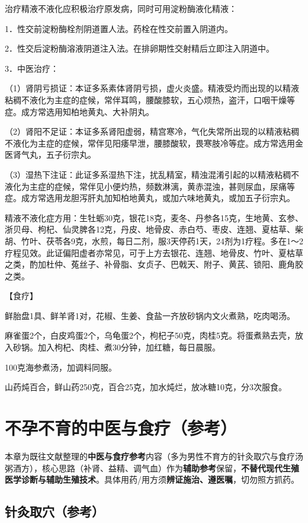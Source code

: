 \documentclass[12pt,UTF8,openany]{ctexbook}
\begin{document}
治疗精液不液化应积极治疗原发病，同时可用淀粉酶液化精液：

1．性交前淀粉酶栓剂阴道置人法。药栓在性交前置入阴道内。

2．性交后淀粉酶溶液阴道注入法。在排卵期性交射精后立即注入阴道中。

3．中医治疗：

（1）肾阴亏损证：本证多系素体肾阴亏损，虚火炎盛。精液受灼而出现的以精液粘稠不液化为主症的症候，常伴耳鸣，腰酸膝软，五心烦热，盗汗，口咽干燥等症。成方常选用知柏地黄丸、大补阴丸。

（2）肾阳不足证：本证多系肾阳虚弱，精宫寒冷，气化失常所出现的以精液粘稠不液化为主症的症候，常伴见阳痿早泄，腰膝酸软，畏寒肢冷等症。成方常选用金医肾气丸，五子衍宗丸。

（3）湿热下注证：此证多系湿热下注，扰乱精室，精浊混淆引起的以精液粘稠不液化为主症的症候，常伴见小便灼热，频数淋漓，黄赤混浊，甚则尿血，尿痛等症。成方常选用龙胆泻肝丸加知柏地黄丸，或加六味地黄丸，或加五子衍宗丸。

精液不液化症方用：生牡蛎30克，银花18克，麦冬、丹参各15克，生地黄、玄参、浙贝母、枸杞、仙灵脾各12克，丹皮、地骨皮、赤白芍、枣皮、连翘、夏枯草、柴胡、竹叶、茯苓各9克，水煎，每日二剂，服3天停药1天，24剂为1疗程。多在1～2疗程见效。此证偏阳虚者亦常见，可于上方去银花、连翘、地骨皮、竹叶、夏枯草之类，酌加杜仲、菟丝子、补骨脂、女贞子、巴戟天、附子、黄芪、锁阳、鹿角胶之类。

【食疗】

鲜胎盘1具、鲜羊肾1对，花椒、生姜、食盐一齐放砂锅内文火煮熟，吃肉喝汤。

麻雀蛋2个，白皮鸡蛋2个，乌龟蛋2个，枸杞子50克，肉桂5克。将蛋煮熟去壳，放入砂锅。加入枸杞、肉桂、煮30分钟，加红糖，每日晨服。

100克海参煮汤，加调料同服。

山药炖百合，鲜山药250克，百合25克，加水炖烂，放冰糖10克，分3次服食。

\chapter{不孕不育的中医与食疗（参考）}

本章为既往文献整理的\textbf{中医与食疗参考}内容（多为男性不育方的针灸取穴与食疗汤粥酒方），核心思路（补肾、益精、调气血）作为\textbf{辅助参考}保留，\textbf{不替代现代生殖医学诊断与辅助生殖技术}。具体用药/用方须\textbf{辨证施治、遵医嘱}，切勿照方抓药。

\section{针灸取穴（参考）}
\end{document}
